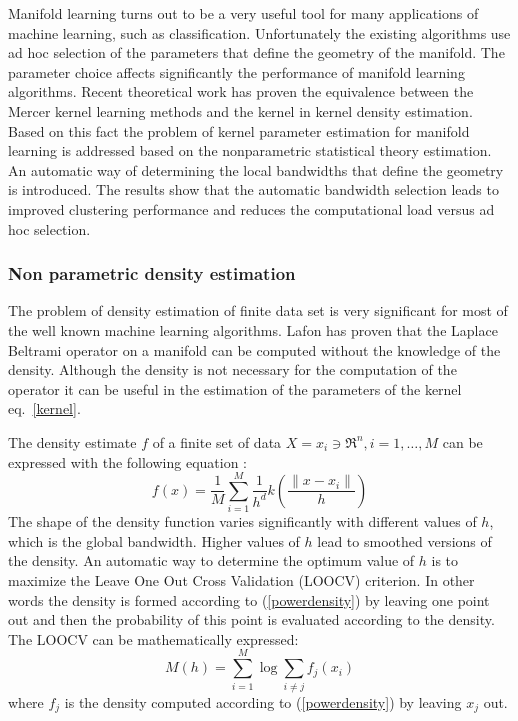 \documentclass[12pt,letterpaper,doublespaced,ETD,dvips,proposal]{gtthesis}
\begin{document}
\begin{Body}
Manifold learning turns out to be a very useful tool for many
applications of machine learning, such as classification.
Unfortunately the existing algorithms use ad hoc selection of the
parameters that define the geometry of the manifold. The parameter
choice affects significantly the performance of manifold learning
algorithms. Recent theoretical work has proven the equivalence
between the Mercer kernel learning methods and the kernel in kernel
density estimation. Based on this fact the problem of kernel
parameter estimation for manifold learning is addressed based on the
nonparametric statistical theory estimation. An automatic way of
determining the local bandwidths that define the geometry is
introduced. The results show that the automatic bandwidth selection
leads to improved clustering performance and reduces the
computational load versus ad hoc selection.

\subsubsection{Non parametric  density estimation} The problem of
density estimation of finite data set is very significant for most
of the well known machine learning algorithms. Lafon has proven that
the Laplace Beltrami operator on a manifold can be computed without
the knowledge of the density. Although the density is not necessary
for the computation of the operator it can be useful in the
estimation of the parameters of the kernel eq.~\ref{kernel}.

The  density estimate $f$ of a finite set of data $X={x_i\ni
\Re^n,i=1,\dots,M}$ can be expressed with the following equation
\cite{Silverman}:
\begin{equation}\label{powerdensity}
    f(x)=\frac{1}{M}\sum_{i=1}^{M}\frac{1}{h^d}k\left(\frac{\parallel x-x_i
\parallel}{h}\right)
\end{equation}
The shape of the density function varies significantly with
different values of $h$, which is the global bandwidth. Higher
values of $h$ lead to smoothed versions of the  density. An
automatic way to determine the optimum value of $h$ is to maximize
the Leave One Out Cross Validation (LOOCV) criterion. In other words
the density is formed according to (\ref{powerdensity}) by leaving
one point out and then the probability of this point is evaluated
according to the density. The LOOCV can be mathematically expressed:
\begin{equation}
    M(h)=\sum_{i=1}^{M}\log\sum_{i\neq j}f_j(x_i)
\end{equation}
where $f_j$ is the density computed according to
(\ref{powerdensity}) by leaving $x_j$ out.


\end{Body}
\end{document}
